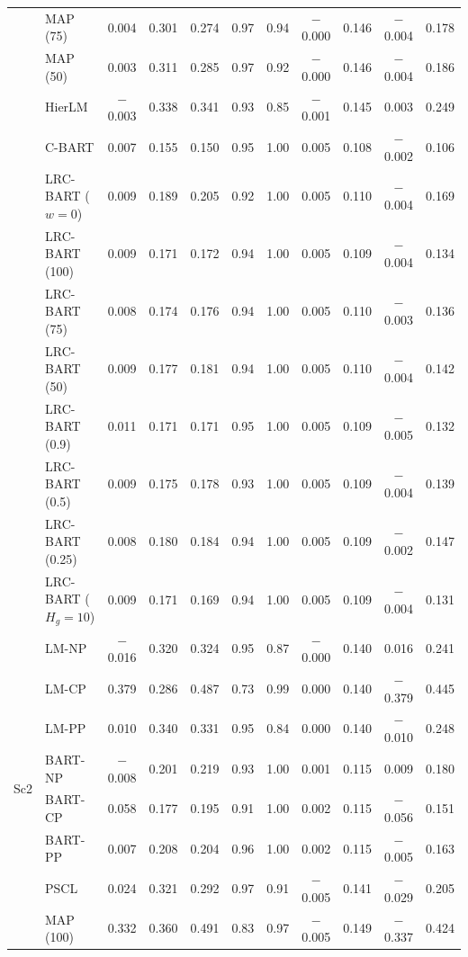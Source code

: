 \documentclass[11pt]{article}
\theoremstyle{definition}
\theoremstyle{plain}
\begin{document}
\begin{center}
\begin{longtable}{llccccccccc}
& MAP (75) & 0.004 & 0.301 & 0.274 & 0.97 & 0.94 & $-$0.000 & 0.146 & $-$0.004 & 0.178 \\
& MAP (50) & 0.003 & 0.311 & 0.285 & 0.97 & 0.92 & $-$0.000 & 0.146 & $-$0.004 & 0.186 \\
& HierLM & $-$0.003 & 0.338 & 0.341 & 0.93 & 0.85 & $-$0.001 & 0.145 & 0.003 & 0.249 \\
& C-BART & 0.007 & 0.155 & 0.150 & 0.95 & 1.00 & 0.005 & 0.108 & $-$0.002 & 0.106 \\
& LRC-BART ($w=0$) & 0.009 & 0.189 & 0.205 & 0.92 & 1.00 & 0.005 & 0.110 & $-$0.004 & 0.169 \\
& LRC-BART (100) & 0.009 & 0.171 & 0.172 & 0.94 & 1.00 & 0.005 & 0.109 & $-$0.004 & 0.134 \\
& LRC-BART (75) & 0.008 & 0.174 & 0.176 & 0.94 & 1.00 & 0.005 & 0.110 & $-$0.003 & 0.136 \\
& LRC-BART (50) & 0.009 & 0.177 & 0.181 & 0.94 & 1.00 & 0.005 & 0.110 & $-$0.004 & 0.142 \\
& LRC-BART (0.9) & 0.011 & 0.171 & 0.171 & 0.95 & 1.00 & 0.005 & 0.109 & $-$0.005 & 0.132 \\
& LRC-BART (0.5) & 0.009 & 0.175 & 0.178 & 0.93 & 1.00 & 0.005 & 0.109 & $-$0.004 & 0.139 \\
& LRC-BART (0.25) & 0.008 & 0.180 & 0.184 & 0.94 & 1.00 & 0.005 & 0.109 & $-$0.002 & 0.147 \\
& LRC-BART ($H_g=10$) & 0.009 & 0.171 & 0.169 & 0.94 & 1.00 & 0.005 & 0.109 & $-$0.004 & 0.131 \\
\midrule
\multirow{20}{*}{Sc2} & LM-NP & $-$0.016 & 0.320 & 0.324 & 0.95 & 0.87 & $-$0.000 & 0.140 & 0.016 & 0.241 \\
& LM-CP & 0.379 & 0.286 & 0.487 & 0.73 & 0.99 & 0.000 & 0.140 & $-$0.379 & 0.445 \\
& LM-PP & 0.010 & 0.340 & 0.331 & 0.95 & 0.84 & 0.000 & 0.140 & $-$0.010 & 0.248 \\
& BART-NP & $-$0.008 & 0.201 & 0.219 & 0.93 & 1.00 & 0.001 & 0.115 & 0.009 & 0.180 \\
& BART-CP & 0.058 & 0.177 & 0.195 & 0.91 & 1.00 & 0.002 & 0.115 & $-$0.056 & 0.151 \\
& BART-PP & 0.007 & 0.208 & 0.204 & 0.96 & 1.00 & 0.002 & 0.115 & $-$0.005 & 0.163 \\
& PSCL & 0.024 & 0.321 & 0.292 & 0.97 & 0.91 & $-$0.005 & 0.141 & $-$0.029 & 0.205 \\
& MAP (100) & 0.332 & 0.360 & 0.491 & 0.83 & 0.97 & $-$0.005 & 0.149 & $-$0.337 & 0.424 \\

\end{longtable}
\end{center}
\end{document}
